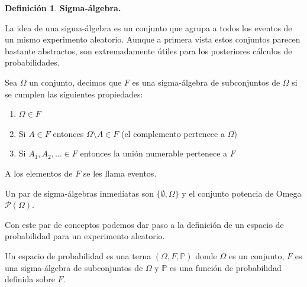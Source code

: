 \documentclass[
 12pt,
 letterpaper,
]{article}
\theoremstyle{teoremaBreak}
\theoremstyle{plain}
\theoremstyle{definition}
\newtheorem{definicion}[teorema]{Definición}
\begin{document}
\begin{definicion}
  
\noindent\textbf{Sigma-álgebra.}

La idea de una sigma-álgebra es un conjunto que agrupa a todos los
eventos de un mismo experimento aleatorio. Aunque a primera vista estos
conjuntos parecen bastante abstractos, son extremadamente útiles para
los posteriores cálculos de probabilidades.

Sea $\Omega$ un conjunto, decimos que $F$ es una sigma-álgebra de subconjuntos de $\Omega$ si se cumplen las siguientes 
propiedades:

\begin{enumerate}
\def\labelenumi{\arabic{enumi}.}
\item
  $\Omega \in F$
\item
  Si $A \in F$ entonces $\Omega \setminus A \in F$ (el complemento pertenece a $\Omega$)
\item
  Si $A_1, A_2, \ldots \in F$ entonces la unión numerable pertenece a $F$
\end{enumerate}
\end{definicion}

A los elementos de $F$ se les llama eventos.

Un par de sigma-álgebras inmediatas son $\{\emptyset, \Omega\}$ y el conjunto potencia de Omega $\mathcal{P}(\Omega)$.

Con este par de conceptos podemos dar paso a la definición de un espacio
de probabilidad para un experimento aleatorio.

Un espacio de probabilidad es una terna $(\Omega, F, \mathbb{P})$ donde $\Omega$ es un
conjunto, $F$ es una sigma-álgebra de subconjuntos de $\Omega$ y $\mathbb{P}$ es una función
de probabilidad definida sobre $F$.
\end{document}
